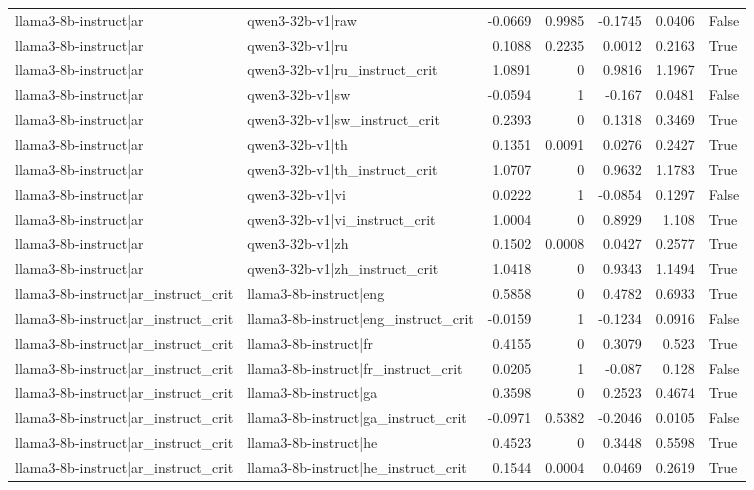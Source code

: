 \begin{table}
\begin{tabular}{l l r r r r l}
llama3-8b-instruct|ar & qwen3-32b-v1|raw & -0.0669 & 0.9985 & -0.1745 & 0.0406 & False \\
llama3-8b-instruct|ar & qwen3-32b-v1|ru & 0.1088 & 0.2235 & 0.0012 & 0.2163 & True \\
llama3-8b-instruct|ar & qwen3-32b-v1|ru_instruct_crit & 1.0891 & 0 & 0.9816 & 1.1967 & True \\
llama3-8b-instruct|ar & qwen3-32b-v1|sw & -0.0594 & 1 & -0.167 & 0.0481 & False \\
llama3-8b-instruct|ar & qwen3-32b-v1|sw_instruct_crit & 0.2393 & 0 & 0.1318 & 0.3469 & True \\
llama3-8b-instruct|ar & qwen3-32b-v1|th & 0.1351 & 0.0091 & 0.0276 & 0.2427 & True \\
llama3-8b-instruct|ar & qwen3-32b-v1|th_instruct_crit & 1.0707 & 0 & 0.9632 & 1.1783 & True \\
llama3-8b-instruct|ar & qwen3-32b-v1|vi & 0.0222 & 1 & -0.0854 & 0.1297 & False \\
llama3-8b-instruct|ar & qwen3-32b-v1|vi_instruct_crit & 1.0004 & 0 & 0.8929 & 1.108 & True \\
llama3-8b-instruct|ar & qwen3-32b-v1|zh & 0.1502 & 0.0008 & 0.0427 & 0.2577 & True \\
llama3-8b-instruct|ar & qwen3-32b-v1|zh_instruct_crit & 1.0418 & 0 & 0.9343 & 1.1494 & True \\
llama3-8b-instruct|ar_instruct_crit & llama3-8b-instruct|eng & 0.5858 & 0 & 0.4782 & 0.6933 & True \\
llama3-8b-instruct|ar_instruct_crit & llama3-8b-instruct|eng_instruct_crit & -0.0159 & 1 & -0.1234 & 0.0916 & False \\
llama3-8b-instruct|ar_instruct_crit & llama3-8b-instruct|fr & 0.4155 & 0 & 0.3079 & 0.523 & True \\
llama3-8b-instruct|ar_instruct_crit & llama3-8b-instruct|fr_instruct_crit & 0.0205 & 1 & -0.087 & 0.128 & False \\
llama3-8b-instruct|ar_instruct_crit & llama3-8b-instruct|ga & 0.3598 & 0 & 0.2523 & 0.4674 & True \\
llama3-8b-instruct|ar_instruct_crit & llama3-8b-instruct|ga_instruct_crit & -0.0971 & 0.5382 & -0.2046 & 0.0105 & False \\
llama3-8b-instruct|ar_instruct_crit & llama3-8b-instruct|he & 0.4523 & 0 & 0.3448 & 0.5598 & True \\
llama3-8b-instruct|ar_instruct_crit & llama3-8b-instruct|he_instruct_crit & 0.1544 & 0.0004 & 0.0469 & 0.2619 & True \\

\end{tabular}
\end{table}
